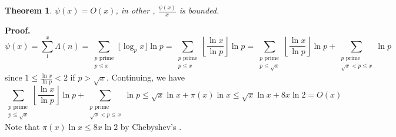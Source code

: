 \documentclass[12pt]{article}
\newtheorem{thm}{Theorem}
\begin{document}
\begin{thm} $\psi(x)=O(x)$, in other , $\frac{\psi(x)}{x}$ is bounded.
\end{thm}
\textbf{Proof. }
\[\psi(x)=\sum_1^x \Lambda(n)=
\sum_{\substack{p\text{ prime}\\p\leq x}}\lfloor \log_p x\rfloor \ln p=
\sum_{\substack{p\text{ prime}\\p\leq x}}\left\lfloor\frac{\ln x}{\ln p}\right\rfloor\ln p=
\sum_{\substack{p\text{ prime}\\p\leq \sqrt{x}}}\left\lfloor\frac{\ln x}{\ln p}\right\rfloor\ln p +
   \sum_{\substack{p\text{ prime}\\\sqrt{x}<p\leq x}}\ln p\]
since $1\leq \frac{\ln x}{\ln p}<2$ if $p>\sqrt{x}$.
Continuing, we have
\[\sum_{\substack{p\text{ prime}\\p\leq \sqrt{x}}}\left\lfloor\frac{\ln x}{\ln p}\right\rfloor\ln p +
   \sum_{\substack{p\text{ prime}\\\sqrt{x}<p\leq x}}\ln p \leq
\sqrt{x}\ln x+\pi(x)\ln x\leq\sqrt{x}\ln x+8x\ln 2=O(x)
\]
Note that $\pi(x)\ln x\leq 8x\ln 2$ by Chebyshev's .
\end{document}
